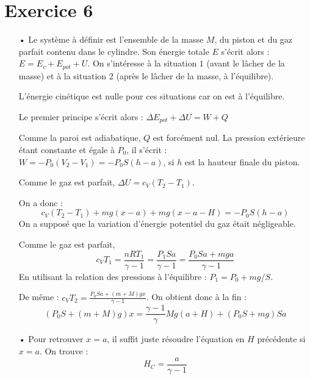 \documentclass{report}
\begin{document}
\section*{Exercice 6}

\begin{itemize}
\item[•] Le système à définir est l'ensemble de la masse $M$, du piston et du gaz parfait contenu dans le cylindre. Son énergie totale $E$ s'écrit alors :$E = E_c + E_{pot} + U$. On s'intéresse à la situation $1$ (avant le lâcher de la masse) et à la situation 2 (après le lâcher de la masse, à l'équilibre).

L'énergie cinétique est nulle pour ces situations car on est à l'équilibre. 

Le premier principe s'écrit alors : $\Delta E_{pot} +\Delta U = W + Q$

Comme la paroi est adiabatique, $Q$ est forcément nul. La pression extérieure étant constante et égale à $P_0$, il s'écrit : $W=-P_0(V_2-V_1)=-P_0S(h-a)$, si $h$ est la hauteur finale du piston.

Comme le gaz est parfait, $\Delta U = c_V(T_2-T_1)$.

On a donc :
\begin{equation}
	c_V(T_2-T_1) + mg(x-a) + mg(x-a-H)=-P_0S(h-a)
\end{equation}
On a supposé que la variation d'énergie potentiel du gaz était négligeable. 

Comme le gaz est parfait, 
\begin{equation}
c_VT_1=\frac{nRT_1}{\gamma-1}=\frac{P_1Sa}{\gamma-1}=\frac{P_0Sa+mga}{\gamma-1}
\end{equation}
En utilisant la relation des pressions à l'équilibre : $P_1=P_0+mg/S$.

De même : $c_VT_2=\frac{P_0Sa+(m+M)gx}{\gamma-1}$.
On obtient donc à la fin :
\begin{equation}
	(P_0S+(m+M)g)x = \frac{\gamma-1}{\gamma}Mg(a+H)+(P_0S+mg)Sa
\end{equation}

\item[•] Pour retrouver $x=a$, il suffit juste résoudre l'équation en $H$ précédente si $x=a$. On trouve :
\begin{equation}
	H_C=\frac{a}{\gamma-1}
\end{equation}

\end{itemize}
\end{document}
